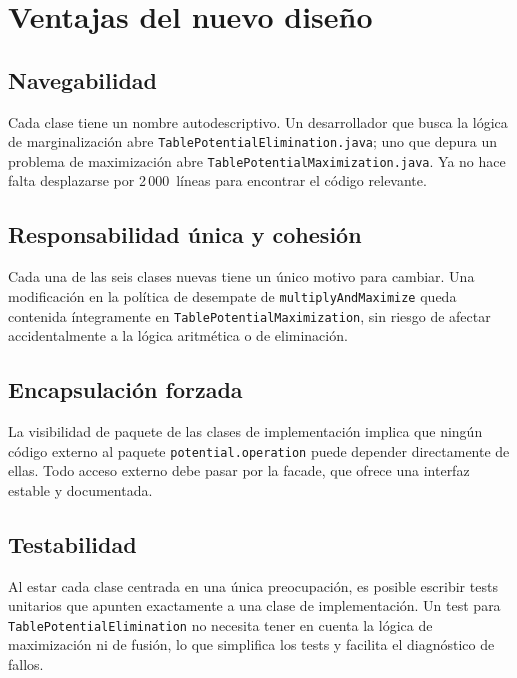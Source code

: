 \documentclass[11pt,a4paper]{article}
\newcommand{\code}[1]{\texttt{#1}}
\begin{document}
\section{Ventajas del nuevo dise\~no}

\subsection{Navegabilidad}

Cada clase tiene un nombre autodescriptivo.  Un desarrollador que busca la l\'ogica
de marginalizaci\'on abre \code{TablePotentialElimination.java}; uno que depura un
problema de maximizaci\'on abre \code{TablePotentialMaximization.java}.  Ya no
hace falta desplazarse por 2\,000~l\'ineas para encontrar el c\'odigo relevante.

\subsection{Responsabilidad \'unica y cohesi\'on}

Cada una de las seis clases nuevas tiene un \'unico motivo para cambiar.  Una
modificaci\'on en la pol\'itica de desempate de \code{multiplyAndMaximize} queda
contenida \'integramente en \code{TablePotentialMaximization}, sin riesgo de
afectar accidentalmente a la l\'ogica aritm\'etica o de eliminaci\'on.

\subsection{Encapsulaci\'on forzada}

La visibilidad de paquete de las clases de implementaci\'on implica que ning\'un
c\'odigo externo al paquete \code{potential.operation} puede depender directamente
de ellas.  Todo acceso externo debe pasar por la facade, que ofrece una interfaz
estable y documentada.

\subsection{Testabilidad}

Al estar cada clase centrada en una \'unica preocupaci\'on, es posible escribir
tests unitarios que apunten exactamente a una clase de implementaci\'on.  Un test
para \code{TablePotentialElimination} no necesita tener en cuenta la l\'ogica de
maximizaci\'on ni de fusi\'on, lo que simplifica los tests y facilita el
diagn\'ostico de fallos.
\end{document}
